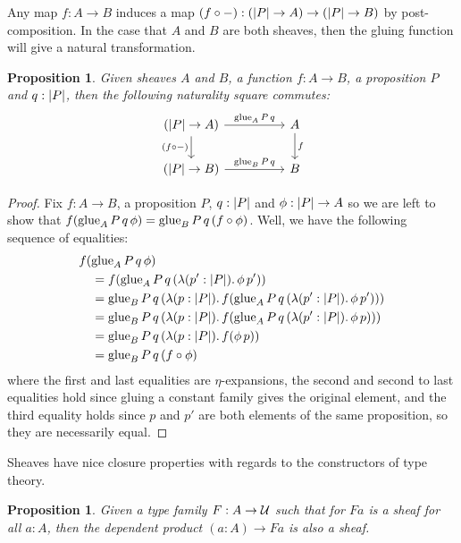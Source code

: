 \documentclass[11pt]{article}
\newtheorem{prop}[thrm]{Proposition}
\begin{document}
Any map \(f : A \to B\) induces a map
\((f\circ-) : (|{P}| \to A) \to (|{P}| \to B)\) by post-composition.
%
In the case that \(A\) and \(B\) are both sheaves, then the gluing function
will give a natural transformation.

\begin{prop}
  Given sheaves \(A\) and \(B\), a function \(f : A \to B\), a proposition \(P\)
  and \(q : |{P}|\), then the following naturality square commutes:
  \[\begin{tikzcd}
      (\IHolds{P} \to A) \arrow[rr , "\IGlue{A}\,P\,q"] \arrow[d, "(f\circ-)"'] && A \arrow[d, "f"]\\
      (\IHolds{P} \to B) \arrow[rr , "\IGlue{B}\,P\,q"] && B
    \end{tikzcd}\]
\end{prop}
\begin{proof}
  Fix \(f : A \to B\), a proposition \(P\), \(q : |{P}|\) and
  \(\phi : |{P}| \to A\) so we are left to show that
  \(f(\text{glue}_{A}\,P\,q\,\phi) = \text{glue}_{B}\,P\,q\,(f \circ \phi)\).
  Well, we have the following sequence of equalities:
  \begin{align*}
    &f(\text{glue}_{A}\,P\,q\,\phi)\\
    &\quad=
      f(\text{glue}_{A}\,P\,q\,({\mathop{\lambda({p':|{P}|}).}{\phi}}\,p'))
      \\
    &\quad=
      \text{glue}_{B}\,P\,q\,({\mathop{\lambda({p:|{P}|}).}{f(\text{glue}_{A}\,P\,q\,({\mathop{\lambda({p':|{P}|}).}{\phi}}\,p'))}})
      \\
    &\quad=
      \text{glue}_{B}\,P\,q\,({\mathop{\lambda({p:|{P}|}).}{f(\text{glue}_{A}\,P\,q\,({\mathop{\lambda({p':|{P}|}).}{\phi}}\,p))}})
      \\
    &\quad=
      \text{glue}_{B}\,P\,q\,({\mathop{\lambda({p:|{P}|}).}{f(\phi\,p)}})
      \\
    &\quad=\text{glue}_{B}\,P\,q\,(f \circ \phi)
  \end{align*}
  where the first and last equalities are \(\eta\)-expansions,
  the second and second to last equalities hold since gluing a constant
  family gives the original element, and the third equality holds
  since \(p\) and \(p'\) are both elements of the same proposition, so they
  are necessarily equal.
\end{proof}

Sheaves have nice closure properties with regards to the constructors of type
theory.

\begin{prop}
  Given a type family \(F : A \to \mathcal{U}\) such that for \(Fa\) is a sheaf for
  all \(a : A\), then the dependent product \((a : A) \to Fa\) is also a
  sheaf.
\end{prop}
\end{document}
